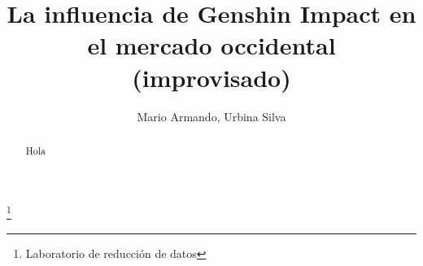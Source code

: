 \documentclass[osajnl,twocolumn,showpacs,superscriptaddress,10pt]{revtex4-2}
\begin{document}
\providecommand{\sumat}[3]{\ensuremath{\sum_{#1}^{#2}{\left\{\hspace{2pt} #3 \hspace{2pt}\right\}}}}
\providecommand{\suma}[3]{\ensuremath{\sum_{#1}^{#2}{#3}}}
\providecommand{\Rarr}[1]{\ensuremath{\hs{#1}\Longrightarrow\hs{#1}}}
\providecommand{\rarr}[1]{\ensuremath{\hs{#1}\longrightarrow\hs{#1}}}

\providecommand{\expo}[1]{\ensuremath{e^{#1}}}
\providecommand{\uvec}[1]{\ensuremath{\hat{#1}}}

\title{La influencia de Genshin Impact en el mercado occidental (improvisado)}
\thanks{Laboratorio de reducción de datos}

\author{Mario Armando, Urbina Silva}
%
\begin{abstract}
    Hola
\end{abstract}
\maketitle
\end{document}
